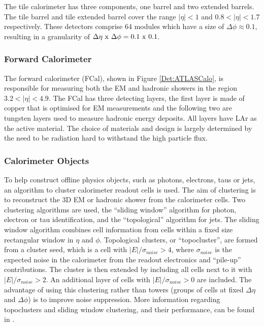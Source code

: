 The tile calorimeter has three components, one barrel and two extended barrels.
The tile barrel and tile extended barrel cover the range $|\eta|<1$ and $0.8<|\eta|<1.7$ respectively.
These detectors comprise 64 modules which have a size of $\Delta\phi\approx0.1$, resulting in a granularity of $\Delta\eta~\rm{x}~\Delta\phi = 0.1~\rm{x}~0.1$.

\subsubsection{Forward Calorimeter}

The forward calorimeter (FCal), shown in Figure \ref{Det:ATLASCalo}, is responsible for measuring both the EM and hadronic showers in the region $3.2<|\eta|<4.9$.
The FCal has three detecting layers, the first layer is made of copper that is optimised for EM measurements and the following two are tungsten layers used to measure hadronic energy deposits.
All layers have LAr as the active material.
The choice of materials and design is largely determined by the need to be radiation hard to withstand the high particle flux.


\subsubsection{Calorimeter Objects}


To help construct offline physics objects, such as photons, electrons, taus or jets, an algorithm to cluster calorimeter readout cells is used.
The aim of clustering is to reconstruct the 3D EM or hadronic shower from the calorimeter cells.
Two clustering algorithms are used, the ``sliding window'' algorithm for photon, electron or tau identification, and the ``topological'' algorithm for jets.
The sliding window algorithm combines cell information from cells within a fixed size rectangular window in $\eta$ and $\phi$. 
Topological clusters, or ``topocluster'', are formed from a cluster seed, which is a cell with $|E|/\sigma_{noise}>4$, where $\sigma_{noise}$ is the expected noise in the calorimeter from the readout electronics and ``pile-up'' contributions. 
The cluster is then extended by including all cells next to it with $|E|/\sigma_{noise}>2$.
An additional layer of cells with $|E|/\sigma_{noise}>0$ are included.
The advantage of using this clustering rather than towers (groups of cells at fixed $\Delta\eta$ and $\Delta\phi$) is to improve noise suppression.
More information regarding topoclusters and sliding window clustering, and their performance, can be found in \cite{ref:ZeeCalib,ref:Clustering}.


